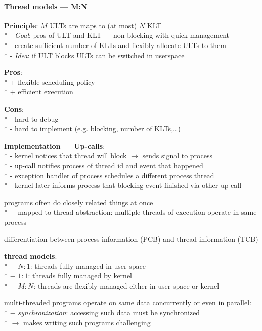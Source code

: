 \paragraph{Thread models --- M:N}
\begin{items}
  \item \textbf{Principle}: \( M \) ULTs are maps to (at most) \( N \) KLT \\*
    - \emph{Goal}: pros of ULT and KLT --- non-blocking with quick management \\*
    - create sufficient number of KLTs and flexibly allocate ULTs to them \\*
    - \emph{Idea}: if ULT blocks ULTs can be switched in userspace
  \item \textbf{Pros}: \\*
    + flexible scheduling policy \\*
    + efficient execution
  \item \textbf{Cons}: \\*
    - hard to debug \\*
    - hard to implement (e.g. blocking, number of KLTs,\dots)
  \item \textbf{Implementation --- Up-calls}: \\*
    - kernel notices that thread will block \( \to \) sends signal to process \\*
    - up-call notifies process of thread id and event that happened \\*
    - exception handler of process schedules a different process thread \\*
    - kernel later informs process that blocking event finished via other up-call
\end{items}

\begin{summary}
  \begin{items}
    \item programs often do closely related things at once \\*
      $ - $  mapped to thread abstraction: multiple threads of execution operate in same process
    \item differentiation between process information (PCB) and thread information (TCB)
    \item \textbf{thread models}: \\*
      $ - $ $ N:1 $: threads fully managed in user-space \\*
      $ - $ $ 1:1 $: threads fully managed by kernel \\*
      $ - $ $ M:N $: threads are flexibly managed either in user-space or kernel
    \item multi-threaded programs operate on same data concurrently or even in parallel: \\*
      $ - $ \emph{synchronization}: accessing such data must be synchronized \\*
      $ \to $ makes writing such programs challenging
  \end{items}
\end{summary}